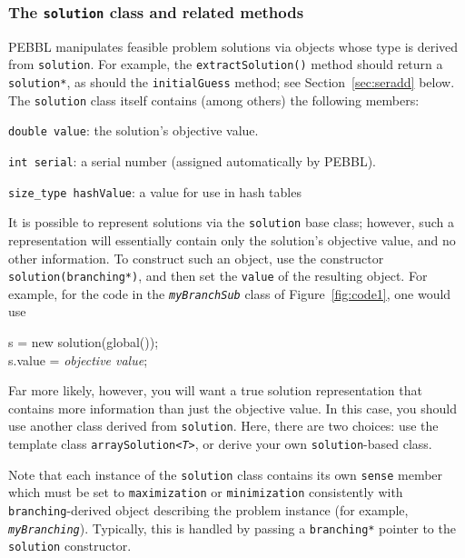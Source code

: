 \subsubsection{The \texttt{solution} class and related methods}
\label{sec:solclassdetails}
PEBBL manipulates feasible problem solutions via objects whose type is
derived from \texttt{solution}.  For example, the
\texttt{extractSolution()} method should return a \texttt{solution*},
as should the \texttt{initialGuess} method; see
Section~\ref{sec:seradd} below.  The \texttt{solution} class itself
contains (among others) the following members:
\begin{description}
\item{\texttt{double value}}: the solution's objective value.
\item{\texttt{int serial}}: a serial number (assigned automatically by
  PEBBL).
\item{\texttt{size\_type hashValue}}: a value for use in hash tables
\end{description}
It is possible to represent solutions via the \texttt{solution} base
class; however, such a representation will essentially contain only
the solution's objective value, and no other information.  
To construct such an object, use the
constructor \texttt{solution(branching*)}, and then set the
\texttt{value} of the resulting object.  For example, for the code in the
\texttt{\emph{myBranchSub}} class of Figure~\ref{fig:code1}, one would
use
\begin{codeblock}
s = new solution(global()); \\
s.value = \emph{objective value};
\end{codeblock}
Far more likely, however, you will want a true solution representation
that contains more information than just the objective value.  In this
case, you should use another class derived from \texttt{solution}.  Here,
there are two choices: use the template class
\texttt{arraySolution<\emph{T}>}, or derive your own \texttt{solution}-based
class.

Note that each instance of the \texttt{solution} class contains its
own \texttt{sense} member which must be set to \texttt{maximization}
or \texttt{minimization} consistently with \texttt{branching}-derived
object describing the problem instance (for example,
\texttt{\emph{myBranching}}).  Typically, this is handled by passing a
\texttt{branching*} pointer to the \texttt{solution} constructor.

